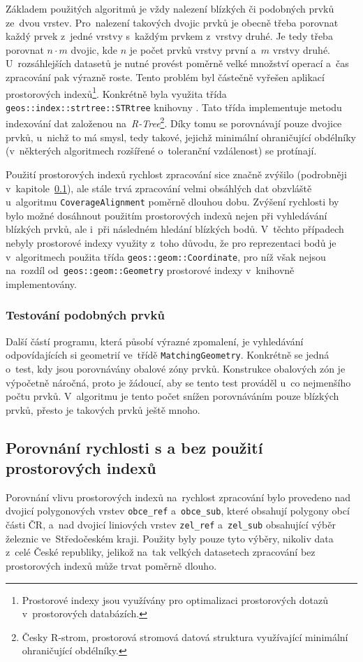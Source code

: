 Základem použitých algoritmů je vždy nalezení blízkých či podobných prvků 
ze~dvou vrstev. Pro~nalezení takových dvojic prvků je obecně třeba porovnat 
každý prvek z~jedné vrstvy s~každým prvkem z~vrstvy druhé. Je tedy třeba 
porovnat $n\cdot m$ dvojic, kde $n$ je počet prvků vrstvy první a~$m$ vrstvy 
druhé. U~rozsáhlejších datasetů je nutné provést poměrně velké množství 
operací a~čas zpracování pak výrazně roste. Tento problém byl částečně vyřešen 
aplikací prostorových indexů\footnote{Prostorové indexy jsou využívány pro 
optimalizaci prostorových dotazů v~prostorových databázích.}. Konkrétně byla 
využita třída \texttt{geos::index::strtree::STRtree} knihovny  .
Tato třída implementuje metodu indexování dat založenou 
na~\textit{R-Tree}\footnote{Česky R-strom, prostorová stromová datová struktura 
využívající minimální ohraničující obdélníky.}. Díky tomu se porovnávají pouze 
dvojice prvků, u~nichž to má smysl, tedy takové, jejichž minimální ohraničující 
obdélníky (v~některých algoritmech rozšířené o~toleranční vzdálenost) se protínají. 

Použití prostorových indexů rychlost zpracování sice značně zvýšilo (podrobněji 
v~kapitole~\ref{problemy-test}), ale stále trvá zpracování velmi obsáhlých dat 
obzvláště u~algo\-ritmu \texttt{Coverage\-Alignment} poměrně 
dlouhou dobu. Zvýšení rychlosti by bylo možné dosáhnout použitím prostorových 
indexů nejen při vyhledávání blízkých prvků, ale i~při následném hledání 
blízkých bodů. V~těchto případech nebyly prostorové indexy využity z~toho 
důvodu, že pro reprezentaci bodů je v~algoritmech použita třída 
\texttt{geos::geom::Coordinate}, pro níž však nejsou na~rozdíl 
od~\texttt{geos::geom::Geometry} prostorové indexy v~knihovně 
 implementovány.

\subsubsection{Testování podobných prvků}

Další částí programu, která působí výrazné zpomalení, je vyhledávání
odpovídajících si geometrií ve~třídě \texttt{MatchingGeometry}. Konkrétně
se jedná o~test, kdy jsou porovnávány obalové zóny prvků. Konstrukce
obalových zón je výpočetně náročná, proto je žádoucí, aby se tento test
prováděl u~co nejmenšího počtu prvků. V~algoritmu je tento počet snížen
porovnáváním pouze blízkých prvků, přesto je takových prvků ještě mnoho.


\subsection{Porovnání rychlosti s a bez použití prostorových indexů}
\label{problemy-test}
Porovnání vlivu prostorových indexů na~rychlost zpracování bylo provedeno 
nad dvojicí polygonových vrstev \texttt{obce\_ref} a~\texttt{obce\_sub}, 
které obsahují polygony obcí části ČR, a~nad dvojicí li\-niových vrstev 
\texttt{zel\_ref} a~\texttt{zel\_sub} obsahující výběr železnic ve~Středočeském 
kraji. Použity byly pouze tyto výběry, nikoliv data z~celé České republiky,
jelikož na~tak velkých datasetech zpracování bez prostorových indexů může 
trvat poměrně dlouho.

